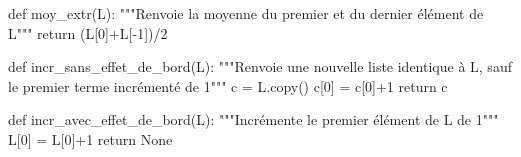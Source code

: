 \question{} 
\begin{pyverbatim}
def moy_extr(L):
    """Renvoie la moyenne du premier et du dernier élément de L"""
    return (L[0]+L[-1])/2
\end{pyverbatim}

\medskip{}

\question{} 
\begin{pyverbatim}
def incr_sans_effet_de_bord(L):
    """Renvoie une nouvelle liste identique à L, 
    sauf le premier terme incrémenté de 1"""
    c = L.copy()
    c[0] = c[0]+1
    return c

def incr_avec_effet_de_bord(L):
    """Incrémente le premier élément de L de 1"""
    L[0] = L[0]+1
    return None
\end{pyverbatim}